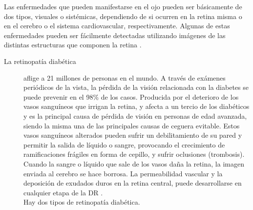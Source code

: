 	

Las enfermedades que pueden manifestarse en el ojo pueden ser b\'asicamente de dos tipos, visuales o sist\'emicas, dependiendo de si ocurren en la retina misma o en el cerebro o el sistema cardiovascular, respectivamente. Algunas de estas enfermedades pueden ser f\'acilmente detectadas utilizando im\'agenes de las distintas estructuras que componen la retina \cite{abramoff2010retinal}.
\begin{description}
\item[La retinopat\'ia diab\'etica] aflige a 21 millones de personas en el mundo.  A trav\'es de ex\'amenes peri\'odicos de la vista, la p\'erdida de la visi\'on relacionada con la diabetes se puede prevenir en el 98\% de los casos. Producida por el deterioro de los vasos sangu\'ineos que irrigan la retina,  y afecta a un tercio de los diab\'eticos  y es la principal causa de p\'erdida de visi\'on en personas de edad avanzada,  siendo la misma una de las principales causas de ceguera evitable. Estos vasos sangu\'ineos alterados pueden sufrir un debilitamiento de su pared y permitir la salida de l\'iquido o sangre, provocando el crecimiento de ramificaciones fr\'agiles en forma de cepillo, y sufrir oclusiones (trombosis). Cuando la sangre o l\'iquido que sale de los vasos daña la retina, la imagen enviada al cerebro se hace borrosa. La permeabilidad vascular y la deposici\'on de exudados duros en la retina central, puede desarrollarse en cualquier etapa de la DR \cite{goh2016retinal}.\\

Hay dos tipos de retinopat\'ia diab\'etica. 


\end{description}
